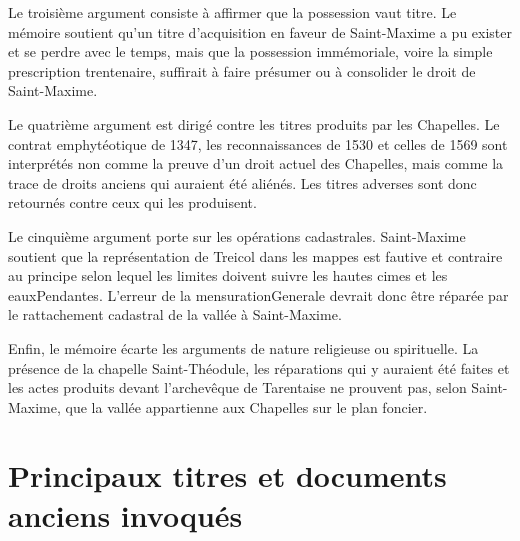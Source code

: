 \documentclass[a4paper,twoside,openany]{article}
\begin{document}
Le troisième argument consiste à affirmer que la possession vaut titre. Le mémoire soutient qu'un titre d'acquisition en faveur de Saint-Maxime a pu exister et se perdre avec le temps, mais que la possession immémoriale, voire la simple \gls{prescription} trentenaire, suffirait à faire présumer ou à consolider le droit de Saint-Maxime.

Le quatrième argument est dirigé contre les titres produits par les Chapelles. Le contrat emphytéotique de 1347, les reconnaissances de 1530 et celles de 1569 sont interprétés non comme la preuve d'un droit actuel des Chapelles, mais comme la trace de droits anciens qui auraient été aliénés. Les titres adverses sont donc retournés contre ceux qui les produisent.

Le cinquième argument porte sur les opérations cadastrales. Saint-Maxime soutient que la représentation de Treicol dans les mappes est fautive et contraire au principe selon lequel les limites doivent suivre les hautes cimes et les \gls{eauxPendantes}. L'erreur de la \gls{mensurationGenerale} devrait donc être réparée par le rattachement cadastral de la vallée à Saint-Maxime.

Enfin, le mémoire écarte les arguments de nature religieuse ou spirituelle. La présence de la chapelle Saint-Théodule, les réparations qui y auraient été faites et les actes produits devant l'archevêque de Tarentaise ne prouvent pas, selon Saint-Maxime, que la vallée appartienne aux Chapelles sur le plan foncier.

\section{Principaux titres et documents anciens invoqués}
\end{document}
